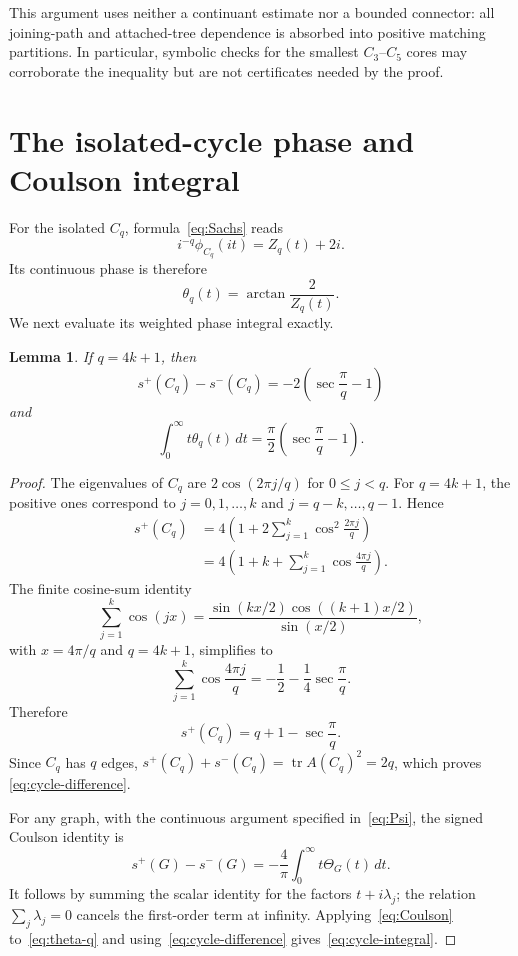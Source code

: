 \documentclass[11pt]{article}
\newtheorem{lemma}[theorem]{Lemma}
\theoremstyle{remark}
\begin{document}
This argument uses neither a continuant estimate nor a bounded connector: all
joining-path and attached-tree dependence is absorbed into positive matching
partitions.  In particular, symbolic checks for the smallest $C_3$--$C_5$
cores may corroborate the inequality but are not certificates needed by the
proof.

\section{The isolated-cycle phase and Coulson integral}

For the isolated $C_q$, formula~\eqref{eq:Sachs} reads
\begin{equation}\label{eq:cycle-Psi}
 i^{-q}\phi_{C_q}(it)=Z_q(t)+2i.
\end{equation}
Its continuous phase is therefore
\begin{equation}\label{eq:theta-q}
 \theta_q(t)=\arctan\frac2{Z_q(t)}.
\end{equation}
We next evaluate its weighted phase integral exactly.

\begin{lemma}\label{lem:cycle}
If $q=4k+1$, then
\begin{equation}\label{eq:cycle-difference}
 s^+(C_q)-s^-(C_q)=-2\left(\sec\frac\pi q-1\right)
\end{equation}
and
\begin{equation}\label{eq:cycle-integral}
 \int_0^\infty t\theta_q(t)\,dt
 =\frac\pi2\left(\sec\frac\pi q-1\right).
\end{equation}
\end{lemma}

\begin{proof}
The eigenvalues of $C_q$ are $2\cos(2\pi j/q)$ for $0\leq j<q$.  For
$q=4k+1$, the positive ones correspond to $j=0,1,\ldots,k$ and
$j=q-k,\ldots,q-1$.  Hence
\begin{align*}
 s^+(C_q)
 &=4\left(1+2\sum_{j=1}^k\cos^2\frac{2\pi j}{q}\right)\\
 &=4\left(1+k+\sum_{j=1}^k\cos\frac{4\pi j}{q}\right).
\end{align*}
The finite cosine-sum identity
\[
 \sum_{j=1}^k\cos(jx)
 =\frac{\sin(kx/2)\cos((k+1)x/2)}{\sin(x/2)},
\]
with $x=4\pi/q$ and $q=4k+1$, simplifies to
\[
 \sum_{j=1}^k\cos\frac{4\pi j}{q}
 =-\frac12-\frac14\sec\frac\pi q.
\]
Therefore
\[
 s^+(C_q)=q+1-\sec\frac\pi q.
\]
Since $C_q$ has $q$ edges,
$s^+(C_q)+s^-(C_q)=\operatorname{tr}A(C_q)^2=2q$, which proves
\eqref{eq:cycle-difference}.

For any graph, with the continuous argument specified in~\eqref{eq:Psi}, the
signed Coulson identity is
\begin{equation}\label{eq:Coulson}
 s^+(G)-s^-(G)
 =-\frac4\pi\int_0^\infty t\Theta_G(t)\,dt.
\end{equation}
It follows by summing the scalar identity for the factors
$t+i\lambda_j$; the relation $\sum_j\lambda_j=0$ cancels the first-order
term at infinity.  Applying~\eqref{eq:Coulson} to~\eqref{eq:theta-q} and
using~\eqref{eq:cycle-difference} gives~\eqref{eq:cycle-integral}.
\end{proof}
\end{document}
